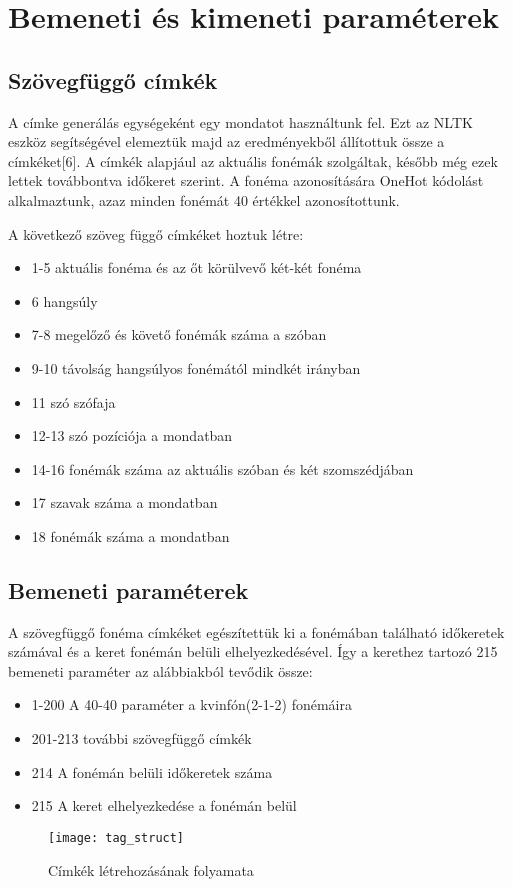 \section{Bemeneti és kimeneti paraméterek}
\subsection{Szövegfüggő címkék}
A címke generálás egységeként egy mondatot használtunk fel. Ezt az NLTK eszköz segítségével elemeztük majd az eredményekből állítottuk össze a címkéket[6]. A címkék alapjául az aktuális fonémák szolgáltak, később még ezek lettek továbbontva időkeret szerint. A fonéma azonosítására OneHot kódolást alkalmaztunk, azaz minden fonémát 40 értékkel azonosítottunk.

A következő szöveg függő címkéket hoztuk létre:

\begin{itemize}
	\item 1-5 aktuális fonéma és az őt körülvevő két-két fonéma
	\item 6 hangsúly
	\item 7-8 megelőző és követő fonémák száma a szóban 
	\item 9-10 távolság hangsúlyos fonémától mindkét irányban
	\item 11 szó szófaja
	\item 12-13 szó pozíciója a mondatban
	\item 14-16 fonémák száma az aktuális szóban és két szomszédjában
	\item 17 szavak száma a mondatban
	\item 18 fonémák száma a mondatban
\end{itemize}

\subsection{Bemeneti paraméterek}
A szövegfüggő fonéma címkéket egészítettük ki a fonémában található időkeretek számával és a keret fonémán belüli elhelyezkedésével. Így a kerethez tartozó 215 bemeneti paraméter az alábbiakból tevődik össze:

\begin{itemize}
	\item 1-200 A 40-40 paraméter a kvinfón(2-1-2) fonémáira
	\item 201-213 további szövegfüggő címkék
	\item 214 A fonémán belüli időkeretek száma
	\item 215 A keret elhelyezkedése a fonémán belül
\end{itemize} 
\begin{figure}[h]
	\par\centering
	\texttt{[image: tag\_struct]}
	\caption{Címkék létrehozásának folyamata}
\end{figure}

